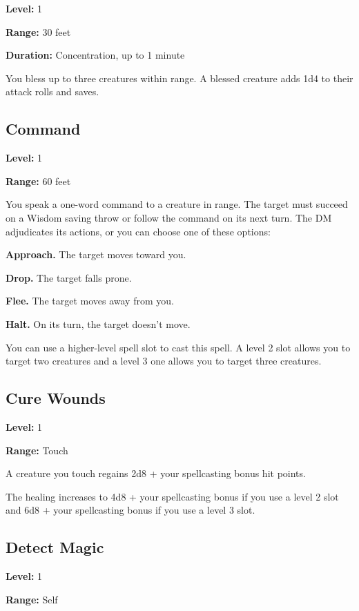 \documentclass[12pt,letterpaper,twocolumn,openany,nodeprecatedcode,bg=none]{dndbook}
\let\oldsubsection\subsection
\renewcommand{\subsection}[1]{%
  \needspace{5\baselineskip}%
  \oldsubsection{#1}%
}
\begin{document}
\textbf{Level:} 1

\textbf{Range:} 30 feet

\textbf{Duration:} Concentration, up to 1 minute

You bless up to three creatures within range. A blessed creature adds
1d4 to their attack rolls and saves.

\newpage

\subsection{Command}\label{command}

\textbf{Level:} 1

\textbf{Range:} 60 feet

You speak a one-word command to a creature in range. The target must
succeed on a Wisdom saving throw or follow the command on its next turn.
The DM adjudicates its actions, or you can choose one of these options:

\textbf{Approach.} The target moves toward you.

\textbf{Drop.} The target falls prone.

\textbf{Flee.} The target moves away from you.

\textbf{Halt.} On its turn, the target doesn't move.

You can use a higher-level spell slot to cast this spell. A level 2 slot
allows you to target two creatures and a level 3 one allows you to
target three creatures.

\subsection{Cure Wounds}\label{cure-wounds}

\textbf{Level:} 1

\textbf{Range:} Touch

A creature you touch regains 2d8 + your spellcasting bonus hit points.

The healing increases to 4d8 + your spellcasting bonus if you use a
level 2 slot and 6d8 + your spellcasting bonus if you use a level 3
slot.

\subsection{Detect Magic}\label{detect-magic}

\textbf{Level:} 1

\textbf{Range:} Self
\end{document}
